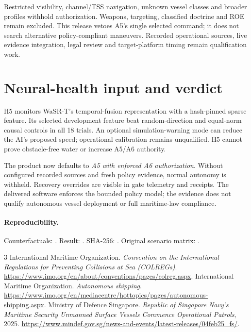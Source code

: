 \documentclass[sigconf,nonacm]{acmart}
\begin{document}
Restricted visibility, channel/TSS navigation, unknown vessel classes and broader profiles withhold authorization. Weapons, targeting, classified doctrine and ROE remain excluded. This release vetoes A5's single selected command; it does not search alternative policy-compliant maneuvers. Recorded operational sources, live evidence integration, legal review and target-platform timing remain qualification work.

\section{Neural-health input and verdict}
H5 monitors WaSR-T's temporal-fusion representation with a hash-pinned sparse feature. Its selected development feature beat random-direction and equal-norm causal controls in all 18 trials. An optional simulation-warning mode can reduce the AI's proposed speed; operational calibration remains unqualified. H5 cannot prove obstacle-free water or increase A5/A6 authority.

The product now defaults to \emph{A5 with enforced A6 authorization}. Without configured recorded sources and fresh policy evidence, normal autonomy is withheld. Recovery overrides are visible in gate telemetry and receipts. The delivered software enforces the bounded policy model; the evidence does not qualify autonomous vessel deployment or full maritime-law compliance.

\paragraph{Reproducibility.}
\begin{sloppypar}
Counterfactuals: . Result: . SHA-256: \texttt{}. Original scenario matrix: .
\end{sloppypar}

\balance
\begin{thebibliography}{3}
 International Maritime Organization. \emph{Convention on the International Regulations for Preventing Collisions at Sea (COLREGs)}. \url{https://www.imo.org/en/about/conventions/pages/colreg.aspx}.
 International Maritime Organization. \emph{Autonomous shipping}. \url{https://www.imo.org/en/mediacentre/hottopics/pages/autonomous-shipping.aspx}.
 Ministry of Defence Singapore. \emph{Republic of Singapore Navy's Maritime Security Unmanned Surface Vessels Commence Operational Patrols}, 2025. \url{https://www.mindef.gov.sg/news-and-events/latest-releases/04feb25_fs/}.
\end{thebibliography}
\end{document}
